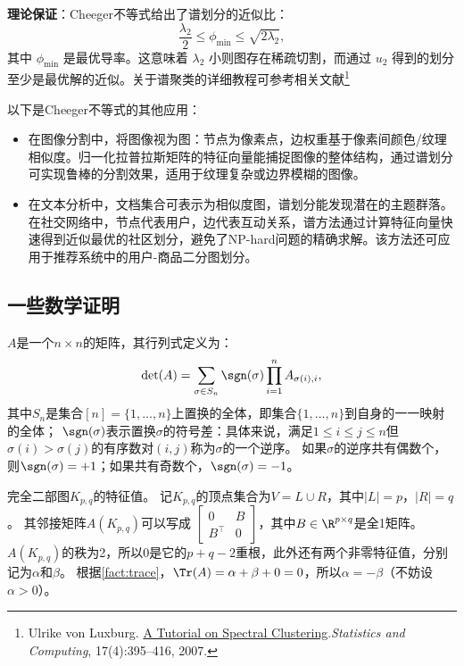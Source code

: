 \documentclass[lang=cn,newtx,10pt,scheme=chinese,chinesefont=nofont,citestyle=gb7714-2015, bibstyle=gb7714-2015]{elegantbook}
\begin{document}
\begin{refsection}
\textbf{理论保证}：Cheeger不等式给出了谱划分的近似比：
\[
\frac{\lambda_2}{2} \leq \phi_{\min} \leq \sqrt{2\lambda_2},
\]
其中 $\phi_{\min}$ 是最优导率。这意味着 $\lambda_2$ 小则图存在稀疏切割，而通过 $u_2$ 得到的划分至少是最优解的近似。关于谱聚类的详细教程可参考相关文献\footnote{Ulrike von Luxburg. \href{https://arxiv.org/abs/0711.0189}{A Tutorial on Spectral Clustering}.\textit{Statistics and Computing}, 17(4):395–416, 2007.} 

以下是Cheeger不等式的其他应用：\begin{itemize}
    \item 在图像分割中，将图像视为图：节点为像素点，边权重基于像素间颜色/纹理相似度。归一化拉普拉斯矩阵的特征向量能捕捉图像的整体结构，通过谱划分可实现鲁棒的分割效果，适用于纹理复杂或边界模糊的图像。
    \item 在文本分析中，文档集合可表示为相似度图，谱划分能发现潜在的主题群落。在社交网络中，节点代表用户，边代表互动关系，谱方法通过计算特征向量快速得到近似最优的社区划分，避免了NP-hard问题的精确求解。该方法还可应用于推荐系统中的用户-商品二分图划分。
\end{itemize}

\subsection{一些数学证明}

\begin{fact}[莱布尼兹公式]\label{fact:det}
    $A$是一个$n\times n$的矩阵，其行列式定义为：
    \[
    \det(A)=\sum_{\sigma\in S_n}\sgn(\sigma)\prod_{i=1}^n A_{\sigma(i),i},
    \]
    其中$S_n$是集合$[n]=\{1,\dots,n\}$上置换的全体，即集合$\{1,\dots,n\}$到自身的一一映射的全体；
    $\sgn(\sigma)$表示置换$\sigma$的符号差：具体来说，满足$1\le i\le j\le n$但$\sigma(i)>\sigma(j)$的有序数对$(i,j)$称为$\sigma$的一个逆序。
    如果$\sigma$的逆序共有偶数个，则$\sgn(\sigma)=+1$；如果共有奇数个，$\sgn(\sigma)=-1$。
\end{fact}

\example 完全二部图$K_{p,q}$的特征值。
\label{eigenvalue of binary}
记$K_{p,q}$的顶点集合为$V=L\cup R$，其中$|L|=p$，$|R|=q$。
其邻接矩阵$A(K_{p,q})$可以写成
$\begin{bmatrix} 0 & B \\ B^\top & 0 \end{bmatrix}$，其中$B\in\R^{p\times q}$是全1矩阵。
$A(K_{p,q})$的秩为2，所以0是它的$p+q-2$重根，此外还有两个非零特征值，分别记为$\alpha$和$\beta$。
根据\cref{fact:trace}，$\Tr(A)=\alpha+\beta+0=0$，所以$\alpha=-\beta$（不妨设$\alpha>0$）。


\end{refsection}
\end{document}
